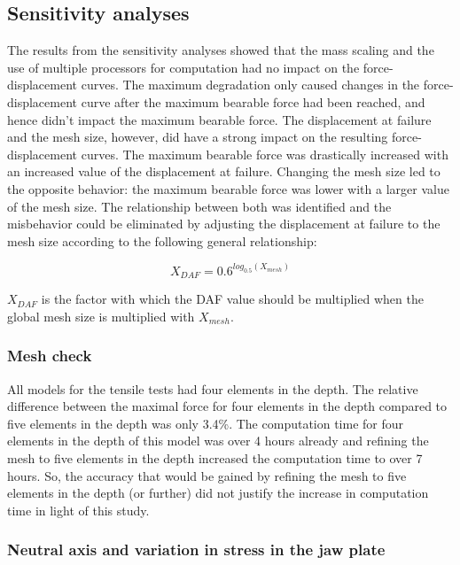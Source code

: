 \subsection{Sensitivity analyses}

The results from the sensitivity analyses showed that the mass scaling and the use of multiple processors for computation had no impact on the force-displacement curves. The maximum degradation only caused changes in the force-displacement curve after the maximum bearable force had been reached, and hence didn't impact the maximum bearable force. The displacement at failure and the mesh size, however, did have a strong impact on the resulting force-displacement curves. The maximum bearable force was drastically increased with an increased value of the displacement at failure. Changing the mesh size led to the opposite behavior: the maximum bearable force was lower with a larger value of the mesh size. The relationship between both was identified and the misbehavior could be eliminated by adjusting the displacement at failure to the mesh size according to the following general relationship:

\begin{equation}
X_{DAF}=0.6^{log_{0.5}(X_{mesh})}
\end{equation}

\noindent $X_{DAF}$ is the factor with which the DAF value should be multiplied when the global mesh size is multiplied with $X_{mesh}$.

\subsubsection{Mesh check}

All models for the tensile tests had four elements in the depth. The relative difference between the maximal force for four elements in the depth compared to five elements in the depth was only 3.4\%. The computation time for four elements in the depth of this model was over 4 hours already and refining the mesh to five elements in the depth increased the computation time to over 7 hours. So, the accuracy that would be gained by refining the mesh to five elements in the depth (or further) did not justify the increase in computation time in light of this study.

\subsubsection{Neutral axis and variation in stress in the jaw plate}

